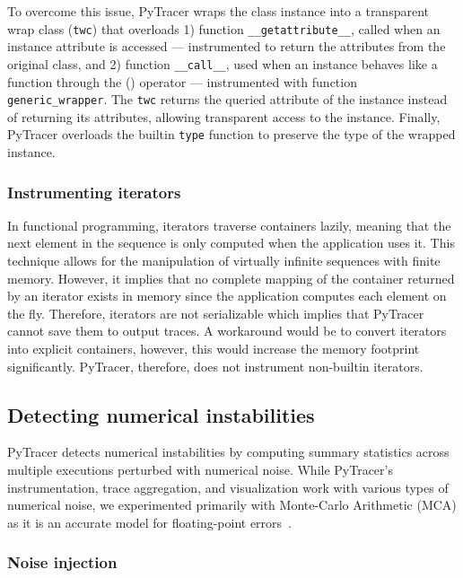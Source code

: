 \documentclass[10pt,journal,compsoc]{IEEEtran}
\newcommand{\pytracer}[0]{PyTracer\xspace}
\DeclareRobustCommand{\addCite}[1]{{\sethlcolor{lightgreen}\hl{\mbox{#1}}}}
\begin{document}
To overcome this issue, \pytracer wraps the class instance into a transparent
wrap class (\texttt{twc}) that overloads 1) function
\texttt{\_\_getattribute\_\_}, called when an instance attribute is accessed ---
instrumented to return the attributes from the original class, and 2) function
\texttt{\_\_call\_\_}, used when an instance behaves like a function through the
() operator --- instrumented with function \texttt{generic\_wrapper}. The
\texttt{twc} returns the queried attribute of the instance instead of returning
its attributes, allowing transparent access to the instance.  Finally, \pytracer
overloads the builtin \texttt{type} function to preserve the type of the wrapped
instance.

\subsubsection{Instrumenting iterators}

In functional programming, iterators traverse containers lazily, meaning that
the next element in the sequence is only computed when the application uses it.
This technique allows for the manipulation of virtually infinite sequences with
finite memory. However, it implies that no complete mapping of the container
returned by an iterator exists in memory since the application computes each
element on the fly. Therefore, iterators are not serializable which implies that
\pytracer cannot save them to output traces. A workaround would be to convert
iterators into explicit containers, however, this would increase the memory
footprint significantly. \pytracer, therefore, does not instrument non-builtin
iterators.

\subsection{Detecting numerical instabilities}

\pytracer detects numerical instabilities by computing summary statistics across
multiple executions perturbed with numerical noise. While \pytracer's
instrumentation, trace aggregation, and visualization work with various types of
numerical noise, we experimented primarily with Monte-Carlo Arithmetic (MCA) as
it is an accurate model for floating-point errors~\addCite{\cite{verificarlo}}.

\subsubsection{Noise injection}
\label{sec:fuzzy}
\end{document}
